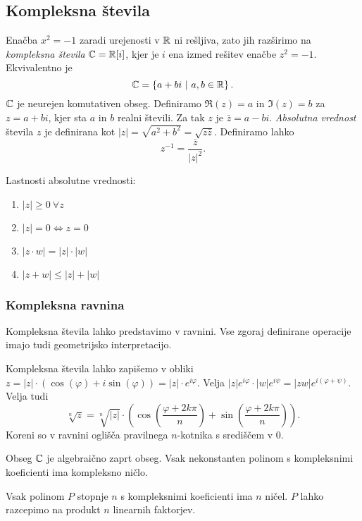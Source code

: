 \documentclass[12pt, a4paper]{article}
\begin{document}
\newpage

\subsection{Kompleksna števila}

Enačba $x^2=-1$ zaradi urejenosti v $\mathbb{R}$ ni rešljiva, zato jih razširimo na \emph{kompleksna števila} $\mathbb{C}=\mathbb{R}[i]$, kjer je $i$ ena izmed rešitev enačbe $z^2=-1$. Ekvivalentno je
\[
\mathbb{C}=\left\{a+bi~\middle\vert~a,b\in\mathbb{R}\right\}.
\]
$\mathbb{C}$ je neurejen komutativen obseg. Definiramo $\Re(z)=a$ in $\Im(z)=b$ za $z=a+bi$, kjer sta $a$ in $b$ realni števili. Za tak $z$ je $\bar{z}=a-bi$. \emph{Absolutna vrednost} števila $z$ je definirana kot $|z|=\sqrt{a^2+b^2}=\sqrt{z\bar{z}}$. Definiramo lahko
\[
z^{-1}=\frac{\overline{z}}{|z|^2}.
\]

Lastnosti absolutne vrednosti:

\begin{enumerate}[label=\arabic*)]
\item $|z|\geq 0~\forall z$
\item $|z|=0\iff z=0$
\item $|z\cdot w|=|z|\cdot|w|$
\item $|z+w|\leq |z|+|w|$
\end{enumerate}

\subsubsection{Kompleksna ravnina}
Kompleksna števila lahko predstavimo v ravnini. Vse zgoraj definirane operacije imajo tudi geometrijsko interpretacijo.

Kompleksna števila lahko zapišemo v obliki $z=|z|\cdot(\cos(\varphi)+i\sin(\varphi))=|z|\cdot e^{i\varphi}.$ Velja $|z|e^{i\varphi}\cdot |w|e^{i\psi}=|zw|e^{i(\varphi+\psi)}$. Velja tudi
\[
\sqrt[n]{z}=\sqrt[n]{|z|}\cdot\left(\cos\left(\frac{\varphi+2k\pi}{n}\right)+\sin\left(\frac{\varphi+2k\pi}{n}\right)\right).
\]
Koreni so v ravnini oglišča pravilnega $n$-kotnika s središčem v $0$.

\begin{izrek}
Obseg $\mathbb{C}$ je algebraično zaprt obseg. Vsak nekonstanten polinom s kompleksnimi koeficienti ima kompleksno ničlo.
\end{izrek}

\begin{posledica}
Vsak polinom $P$ stopnje $n$ s kompleksnimi koeficienti ima $n$ ničel. $P$ lahko razcepimo na produkt $n$ linearnih faktorjev.
\end{posledica}
\end{document}
